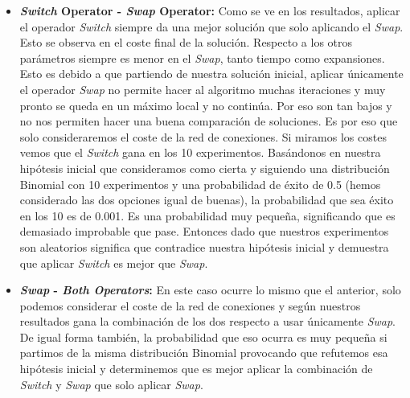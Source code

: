 \documentclass{article}
\begin{document}
\begin{enumerate}
  \begin{itemize}
    \item \textbf{\textit{Switch} Operator - \textit{Swap} Operator:} Como se ve en los resultados, aplicar el operador \textit{Switch} siempre da una mejor solución que solo aplicando el \textit{Swap}. Esto se observa en el coste final de la solución. Respecto a los otros parámetros siempre es menor en el \textit{Swap}, tanto tiempo como expansiones. Esto es debido a que partiendo de nuestra solución inicial, aplicar únicamente el operador \textit{Swap} no permite hacer al algoritmo muchas iteraciones y muy pronto se queda en un máximo local y no continúa. Por eso son tan bajos y no nos permiten hacer una buena comparación de soluciones. Es por eso que solo consideraremos el coste de la red de conexiones. Si miramos los costes vemos que el \textit{Switch} gana en los 10 experimentos. Basándonos en nuestra hipótesis inicial que consideramos como cierta y siguiendo una distribución Binomial con 10 experimentos y una probabilidad de éxito de 0.5 (hemos considerado las dos opciones igual de buenas), la probabilidad que sea éxito en los 10 es de 0.001. Es una probabilidad muy pequeña, significando que es demasiado improbable que pase. Entonces dado que nuestros experimentos son aleatorios significa que contradice nuestra hipótesis inicial y demuestra que aplicar \textit{Switch} es mejor que \textit{Swap}.
    \item \textbf{\textit{Swap} - \textit{Both Operators}:} En este caso ocurre lo mismo que el anterior, solo podemos considerar el coste de la red de conexiones y según nuestros resultados gana la combinación de los dos respecto a usar únicamente \textit{Swap}. De igual forma también, la probabilidad que eso ocurra es muy pequeña si partimos de la misma distribución Binomial provocando que refutemos esa hipótesis inicial y determinemos que es mejor aplicar la combinación de \textit{Switch} y \textit{\textit{Swap}} que solo aplicar \textit{\textit{Swap}}.

\end{itemize}
\end{enumerate}
\end{document}
